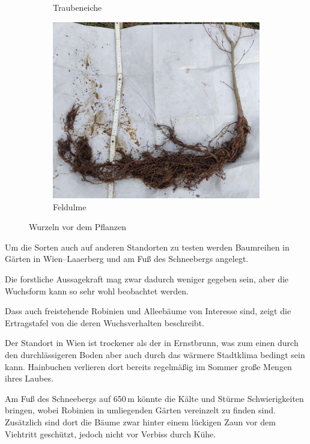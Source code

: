 \documentclass[twocolumn]{scrartcl}
\begin{document}
\begin{figure}[htbp]
\begin{subfigure}[t]{0.95\linewidth}
    \caption{Traubeneiche}
  \end{subfigure}
  \begin{subfigure}[t]{0.95\linewidth}
    \centering
    \includegraphics[width=\linewidth]{./bild/wurzelUlme}
    \caption{Feldulme}
  \end{subfigure}
  \caption{Wurzeln vor dem Pflanzen}
  \label{fig:wurzelAndere}
\end{figure}

Um die Sorten auch auf anderen Standorten zu testen werden Baumreihen
in Gärten in Wien--Laaerberg und am Fuß des Schneebergs angelegt.

Die forstliche Aussagekraft mag zwar dadurch weniger gegeben sein,
aber die Wuchsform kann so sehr wohl beobachtet werden.

Dass auch freistehende Robinien und Alleebäume von Interesse sind,
zeigt die Ertragstafel von \citet{fekete1931robinieErtragstafel} die
deren Wuchsverhalten beschreibt.

Der Standort in Wien ist trockener als der in Ernstbrunn, was zum
einen durch den durchlässigeren Boden aber auch durch das wärmere
Stadtklima bedingt sein kann. Hainbuchen verlieren dort bereits
regelmäßig im Sommer große Mengen ihres Laubes.

Am Fuß des Schneebergs auf 650\,m könnte die Kälte und Stürme
Schwierigkeiten bringen, wobei Robinien in umliegenden Gärten
vereinzelt zu finden sind. Zusätzlich sind dort die Bäume zwar hinter
einem lückigen Zaun vor dem Viehtritt geschützt, jedoch nicht vor
Verbiss durch Kühe.
\end{document}
